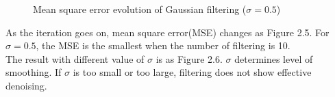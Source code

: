 \documentclass[paper=a4, fontsize=11pt]{scrartcl} %
\numberwithin{equation}{section} %
\numberwithin{figure}{section} %
\numberwithin{table}{section} %
\begin{document}
\begin{figure}[H]
	\centering
	\noindent{}
\caption{Mean square error evolution of Gaussian filtering ($\sigma = 0.5$)}
\end{figure}

As the iteration goes on, mean square error(MSE) changes as Figure 2.5. For $\sigma = 0.5$, the MSE is the smallest when the number of filtering is 10. \\ 

The result with different value of $\sigma$ is as Figure 2.6. $\sigma$ determines level of smoothing. If $\sigma$ is too small or too large, filtering does not show effective denoising.
\end{document}
